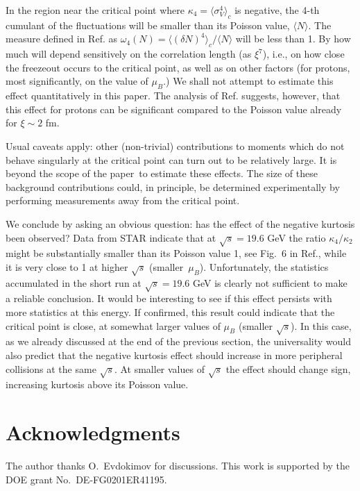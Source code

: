 \documentclass[prl,twocolumn,nofootinbib]{revtex4}
\newcommand\paper{paper}
\newcommand\la{\langle}
\newcommand\ra{\rangle}
\begin{document}
In the region near
the critical point where $\kappa_4=\la\sigma_V^4\ra_c$ is negative, the
4-th cumulant of the fluctuations will be smaller than its Poisson value,
$\la N\ra$. The measure defined in Ref.\cite{Stephanov:2008qz} as
$\omega_4(N)=\la (\delta N)^4\ra_c/\la N \ra$ will be less than 1. By
how much will depend sensitively on the correlation length (as
$\xi^7$), i.e., on how close the freezeout occurs to the critical
point, as well as on other factors (for protons, most significantly, 
on the value of $\mu_B$.)
We shall not attempt to estimate this effect quantitatively in this
\paper. The analysis of Ref.\cite{Athanasiou:2010kw} suggests, 
however, that this effect
for protons can be significant compared to the Poisson value 
already for $\xi\sim 2$ fm.

Usual caveats apply: other (non-trivial) contributions to
moments which do not behave singularly
at the critical point can turn out to be relatively large. It is
beyond the scope of the \paper\ to estimate these effects. The size of
these background contributions could, in principle, be determined
experimentally by performing measurements away from the critical point.

We conclude by asking an obvious question: has the effect of the
negative kurtosis been observed? Data from STAR indicate that at
$\sqrt s=19.6$ GeV the ratio $\kappa_4/\kappa_2$ might be
substantially smaller than its Poisson value 1, 
see Fig.~6 in Ref.\cite{Kumar:2011de},
while it is very close to 1 at higher $\sqrt s$
(smaller~$\mu_B$). Unfortunately, the statistics accumulated in the
short run at $\sqrt s=19.6$ GeV is clearly not sufficient to make a
reliable conclusion.  It would be interesting to see if this effect
persists with more statistics at this energy. If confirmed, this
result could indicate that the critical point is close, at somewhat
larger values of $\mu_B$ (smaller $\sqrt s$). In this case, as we
already discussed at the end of the previous section, the universality
would also predict that the negative kurtosis effect should increase
in more peripheral collisions at the same $\sqrt s$. At smaller values of
$\sqrt s$ the effect should change sign, increasing kurtosis above
its Poisson value.
 

\section*{Acknowledgments}

The author thanks O.~Evdokimov for discussions.
 This work is supported by the DOE grant No.\
DE-FG0201ER41195.
\end{document}
